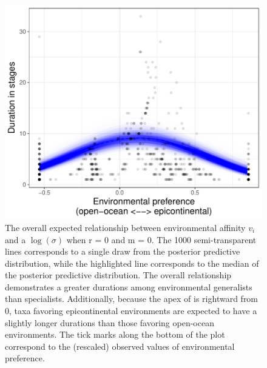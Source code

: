 \documentclass[11pt]{article}
\begin{document}
\begin{figure}[ht]
  \centering
  \includegraphics[height = 0.5\textheight,width=\textwidth,keepaspectratio=true]{figure/env_effect_med_cweib_cens}
  \caption{The overall expected relationship between environmental affinity \(v_{i}\) and a \(\log(\sigma)\) when r = 0 and m = 0. The 1000 semi-transparent lines corresponds to a single draw from the posterior predictive distribution, while the highlighted line corresponds to the median of the posterior predictive distribution. The overall relationship demonstrates a greater durations among environmental generalists than specialists. Additionally, because the apex of is rightward from 0, taxa favoring epicontinental environments are expected to have a slightly longer durations than those favoring open-ocean environments. The tick marks along the bottom of the plot correspond to the (rescaled) observed values of environmental preference.}
  \label{fig:env_mean}
\end{figure}
\end{document}
